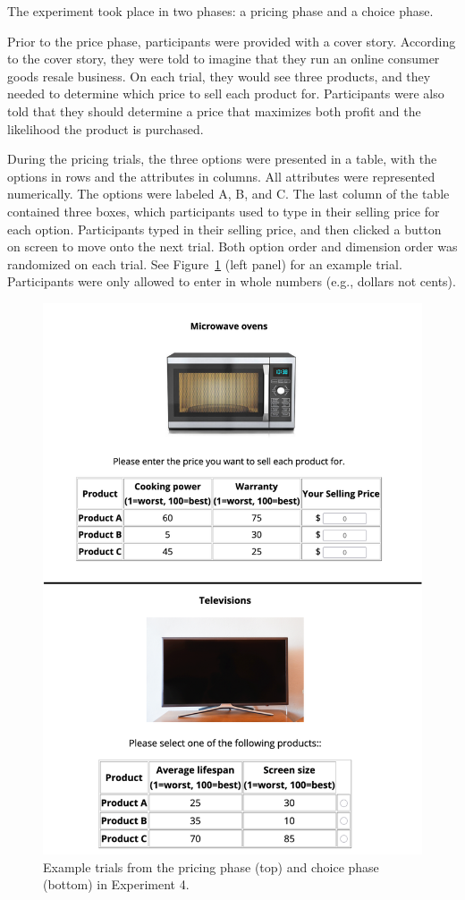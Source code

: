The experiment took place in two phases: a pricing phase and a choice phase.

Prior to the price phase, participants were provided with a cover story. According to the cover story, they were told to imagine that they run an online consumer goods resale business. On each trial, they would see three products, and they needed to determine which price to sell each product for. Participants were also told that they should determine a price that maximizes both profit and the likelihood the product is purchased. 

During the pricing trials, the three options were presented in a table, with the options in rows and the attributes in columns. All attributes were represented numerically. The options were labeled A, B, and C. The last column of the table contained three boxes, which participants used to type in their selling price for each option. Participants typed in their selling price, and then clicked a button on screen to move onto the next trial. Both option order and dimension order was randomized on each trial. See Figure~\ref{fig:ce_rating_choice_trial} (left panel) for an example trial. Participants were only allowed to enter in whole numbers (e.g., dollars not cents).

\begin{figure}
    \includegraphics{figures/ce_rating_choice_example_trial.jpg}
    \caption{Example trials from the pricing phase (top) and choice phase (bottom) in Experiment 4.}
    \label{fig:ce_rating_choice_trial}
\end{figure}

